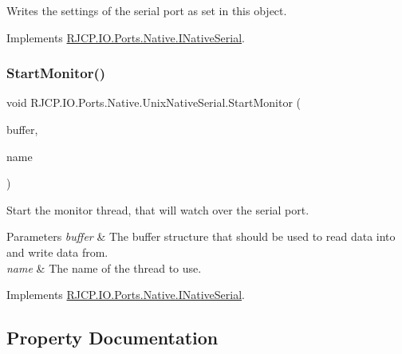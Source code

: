 Writes the settings of the serial port as set in this object. 



Implements \mbox{\hyperlink{interface_r_j_c_p_1_1_i_o_1_1_ports_1_1_native_1_1_i_native_serial_a56ae928a722facd5c4a885eee8c72455}{R\+J\+C\+P.\+I\+O.\+Ports.\+Native.\+I\+Native\+Serial}}.

\mbox{\label{class_r_j_c_p_1_1_i_o_1_1_ports_1_1_native_1_1_unix_native_serial_a1dff48491b2421e1310acdab46d80fbb}} 
\subsubsection{\texorpdfstring{StartMonitor()}{StartMonitor()}}
{\footnotesize\ttfamily void R\+J\+C\+P.\+I\+O.\+Ports.\+Native.\+Unix\+Native\+Serial.\+Start\+Monitor (\begin{DoxyParamCaption}\item[{\mbox{\hyperlink{class_r_j_c_p_1_1_i_o_1_1_ports_1_1_native_1_1_serial_buffer}{Serial\+Buffer}}}]{buffer,  }\item[{string}]{name }\end{DoxyParamCaption})}



Start the monitor thread, that will watch over the serial port. 


\begin{DoxyParams}{Parameters}
{\em buffer} & The buffer structure that should be used to read data into and write data from.\\
\hline
{\em name} & The name of the thread to use.\\
\hline
\end{DoxyParams}


Implements \mbox{\hyperlink{interface_r_j_c_p_1_1_i_o_1_1_ports_1_1_native_1_1_i_native_serial_a64481becda92f402e2eb7728ceb9de06}{R\+J\+C\+P.\+I\+O.\+Ports.\+Native.\+I\+Native\+Serial}}.



\subsection{Property Documentation}
\mbox{\label{class_r_j_c_p_1_1_i_o_1_1_ports_1_1_native_1_1_unix_native_serial_a1ace5ea9f08111a1dbe5c0ebb8a2be5e}} 
